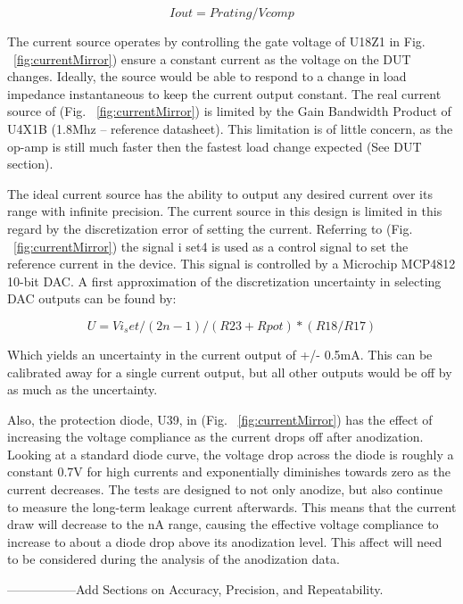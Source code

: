 \documentclass[journal]{IEEEtran}
\begin{document}
\begin{equation}
Iout = Prating / Vcomp
\end{equation}

The current source operates by controlling the gate voltage of U18Z1 in Fig. ~\ref{fig:currentMirror}) ensure a constant current as the voltage on the DUT changes. Ideally, the source would be able to respond to a change in load impedance instantaneous to keep the current output constant. The real current source of (Fig. ~\ref{fig:currentMirror}) is limited by the Gain Bandwidth Product of U4X1B (1.8Mhz – reference datasheet). This limitation is of little concern, as the op-amp is still much faster then the fastest load change expected (See DUT section).

The ideal current source has the ability to output any desired current over its range with infinite precision. The current source in this design is limited in this regard by the discretization error of setting the current. Referring to (Fig. ~\ref{fig:currentMirror}) the signal i set4 is used as a control signal to set the reference current in the device. This signal is controlled by a Microchip MCP4812 10-bit DAC. A first approximation of the discretization uncertainty in selecting DAC outputs can be found by:


\begin{equation}
U = Vi_set /(2n-1) / (R23 + Rpot) *(R18/R17)
\end{equation}

Which yields an uncertainty in the current output of +/- 0.5mA. This can be calibrated away for a single current output, but all other outputs would be off by as much as the uncertainty.

Also, the protection diode, U39, in (Fig. ~\ref{fig:currentMirror}) has the effect of increasing the voltage compliance as the current drops off after anodization. Looking at a standard diode curve, the voltage drop across the diode is roughly a constant 0.7V for high currents and exponentially diminishes towards zero as the current decreases. The tests are designed to not only anodize, but also continue to measure the long-term leakage current afterwards. This means that the current draw will decrease to the nA range, causing the effective voltage compliance to increase to about a diode drop above its anodization level. This affect will need to be considered during the analysis of the anodization data.

-----------------Add Sections on Accuracy, Precision, and Repeatability. 
\end{document}
